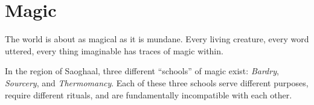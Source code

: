 \chapter{Magic}
The world is about as magical as it is mundane.
Every living creature, every word uttered, every thing imaginable has traces of magic within.

In the region of Saoghaal, three different ``schools'' of magic exist: \textit{Bardry}, \textit{Sourcery}, and \textit{Thermomancy}.
Each of these three schools serve different purposes, require different rituals, and are fundamentally incompatible with each other.




